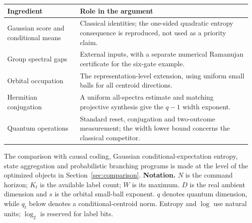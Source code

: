 \begin{center}\small
\begin{tabular}{p{}p{}}
\toprule
Ingredient & Role in the argument\\\midrule
Gaussian score and conditional means & Classical identities; the one-sided
quadratic entropy consequence is reproduced, not used as a priority claim.\\
Group spectral gaps & External inputs, with a separate numerical
Ramanujan certificate for the six-gate example.\\
Orbital occupation & The representation-level extension, using uniform
small balls for all centroid directions.\\
Hermitian conjugation & A uniform all-spectra estimate and matching
projective synthesis give the $q-1$ width exponent.\\
Quantum operations & Standard reset, conjugation and two-outcome
measurement; the width lower bound concerns the classical competitor.\\
\bottomrule
\end{tabular}
\end{center}
The comparison with causal coding, Gaussian conditional-expectation
entropy, state aggregation and probabilistic branching programs is made
at the level of the optimized objects in Section~\ref{sec:comparison}.
\smallskip
\noindent\textbf{Notation.}
$N$ is the command horizon; $K_t$ is the available label count; $W$ is
its maximum. $D$ is the real ambient dimension and $s$ is the orbital
small-ball exponent. $q$ denotes quantum dimension, while $q_t$ below
denotes a conditional-centroid norm. Entropy and $\log$ use natural units;
$\log_2$ is reserved for label bits.
